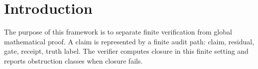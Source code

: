 \section{Introduction}
The purpose of this framework is to separate finite verification from global mathematical proof. A claim is represented by a finite audit path: claim, residual, gate, receipt, truth label. The verifier computes closure in this finite setting and reports obstruction classes when closure fails.
